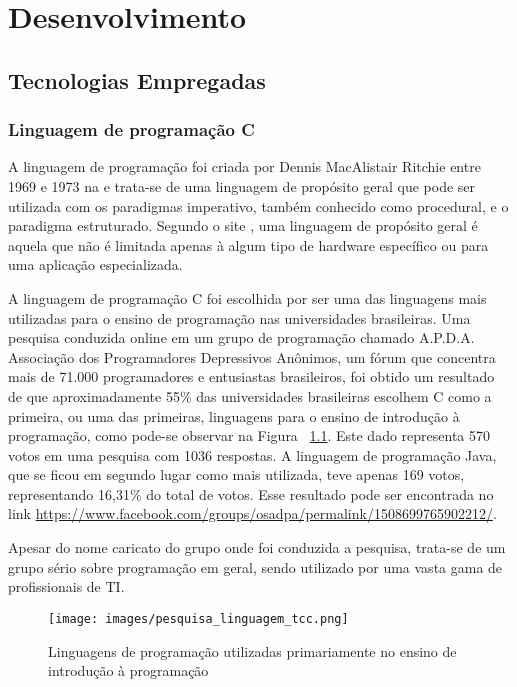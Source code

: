 \documentclass[12pt, %
openright,
oneside, %
a4paper,    %
brazil]{facom-ufu-abntex2}
\begin{document}
\chapter{Desenvolvimento}

\section{Tecnologias Empregadas}

\subsection{Linguagem de programação C}\label{lbl:linguagem_programao_c}
A linguagem de programação  foi criada por Dennis MacAlistair Ritchie entre 1969 e 1973 na  e trata-se de uma linguagem de propósito geral que pode ser utilizada com os paradigmas imperativo, também conhecido como procedural, e o paradigma estruturado. Segundo o site , uma linguagem de propósito geral é aquela que não é limitada apenas à algum tipo de hardware específico ou para uma aplicação especializada.

A linguagem de programação C foi escolhida por ser uma das linguagens mais utilizadas para o ensino de programação nas universidades brasileiras. Uma pesquisa conduzida online em um grupo de programação chamado A.P.D.A. Associação dos Programadores Depressivos Anônimos, um fórum que concentra mais de 71.000 programadores e entusiastas brasileiros, foi obtido um resultado de que aproximadamente 55\% das universidades brasileiras escolhem C como a primeira, ou uma das primeiras, linguagens para o ensino de introdução à programação, como pode-se observar na Figura ~\ref{fig:pesquisa_linguagem_tcc}. Este dado representa 570 votos em uma pesquisa com 1036 respostas. A linguagem de programação Java, que se ficou em segundo lugar como mais utilizada, teve apenas 169 votos, representando 16,31\% do total de votos. Esse resultado pode ser encontrada no link \url{https://www.facebook.com/groups/osadpa/permalink/1508699765902212/}.

Apesar do nome caricato do grupo onde foi conduzida a pesquisa, trata-se de um grupo sério sobre programação em geral, sendo utilizado por uma vasta gama de profissionais de TI.

\pagebreak
\begin{figure}[htbp]
  \centering
  \texttt{[image: images/pesquisa\_linguagem\_tcc.png]}
  \caption{Linguagens de programação utilizadas primariamente no ensino de introdução à programação}
  \label{fig:pesquisa_linguagem_tcc}
\end{figure}
\end{document}
